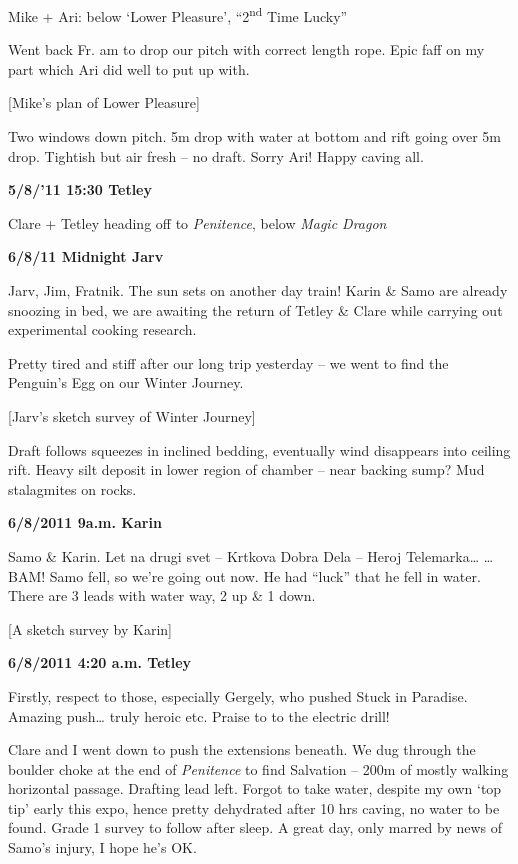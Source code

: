 Mike + Ari: below `Lower Pleasure', ``2\textsuperscript{nd} Time Lucky''

Went back Fr. am to drop our pitch with correct length rope. Epic faff
on my part which Ari did well to put up with.

{[}Mike's plan of Lower Pleasure{]}

Two windows down pitch. 5m drop with water at bottom and rift going over
5m drop. Tightish but air fresh -- no draft. Sorry Ari! Happy caving
all.

\textbf{5/8/'11 15:30 Tetley}

Clare + Tetley heading off to \emph{Penitence}, below \emph{Magic
Dragon}

\textbf{6/8/11 Midnight Jarv}

Jarv, Jim, Fratnik. The sun sets on another day train! Karin \& Samo are
already snoozing in bed, we are awaiting the return of Tetley \& Clare
while carrying out experimental cooking research.

Pretty tired and stiff after our long trip yesterday -- we went to find
the Penguin's Egg on our Winter Journey.

{[}Jarv's sketch survey of Winter Journey{]}

Draft follows squeezes in inclined bedding, eventually wind disappears
into ceiling rift. Heavy silt deposit in lower region of chamber -- near
backing sump? Mud stalagmites on rocks.

\textbf{6/8/2011 9a.m. Karin}

Samo \& Karin. Let na drugi svet -- Krtkova Dobra Dela -- Heroj
Telemarka\ldots{} \ldots{}BAM! Samo fell, so we're going out now. He had
``luck'' that he fell in water. There are 3 leads with water way, 2 up
\& 1 down.

{[}A sketch survey by Karin{]}

\textbf{6/8/2011 4:20 a.m. Tetley}

Firstly, respect to those, especially Gergely, who pushed Stuck in
Paradise. Amazing push\ldots{} truly heroic etc. Praise to to the
electric drill!

Clare and I went down to push the extensions beneath. We dug through the
boulder choke at the end of \emph{Penitence} to find Salvation -- 200m
of mostly walking horizontal passage. Drafting lead left. Forgot to take
water, despite my own `top tip' early this expo, hence pretty dehydrated
after 10 hrs caving, no water to be found. Grade 1 survey to follow
after sleep. A great day, only marred by news of Samo's injury, I hope
he's OK.

